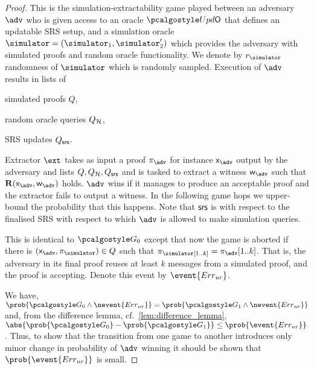 \begin{proof}		
	
	 This is the simulation-extractability game played between an adversary
	$\advse$ who is given access to an oracle $\initU$ that defines an updatable SRS
	setup, and a simulation oracle $\simulator = (\simulator_1, \simulator_2')$ which provides the adversary with simulated
	proofs and random oracle functionality. We denote by $\rsim$
	randomness of $\simulator$ which is randomly sampled. Execution of $\advse$ results in
	lists of
	\begin{inparaenum}[(1)]
		\item simulated proofs $Q$,
		\item random oracle queries $Q_{\mathcal{H}}$,
		\item SRS updates $Q_{\mathsf{srs}}$.
	\end{inparaenum}
	Extractor $\ext$ takes as input a proof $\zkproof_{\advse}$ for instance
	$\inp_{\advse}$ output by the adversary and lists $Q, Q_{\mathcal{H}}, Q_{\mathsf{srs}}$ and is tasked
	to extract a witness $\wit_{\advse}$ such that $\REL(\inp_{\advse}, \wit_{\advse})$
	holds. $\advse$ wins if it manages to produce an acceptable proof and the extractor
	fails to output a witness. In the following game hops we upper-bound the
	probability that this happens. Note that $\mathsf{srs}$ is with respect to the finalised
	SRS with respect to which $\adv$ is allowed to make simulation queries.
	
	 This is identical to $\game{0}$ except that now the game is aborted if
	there is $(\inp_\advse, \zkproof_{\simulator}) \in Q$ such that
	$\zkproof_\simulator[1..k] = \zkproof_{\advse}[1..k]$. That is, the adversary in
	its final proof reuses at least $k$ messages from a simulated proof, and the proof
	is accepting.  Denote this event by $\event{\errur}$.
	
	 We have,
	\( \prob{\game{0} \land \nevent{\errur}} = \prob{\game{1} \land \nevent{\errur}} \)
	and, from the difference lemma, cf.~\cref{lem:difference_lemma},
	$ \abs{\prob{\game{0}} - \prob{\game{1}}} \leq \prob{\event{\errur}}\,$.  Thus, to
	show that the transition from one game to another introduces only minor change in
	probability of $\adv$ winning it should be shown that $\prob{\event{\errur}}$ is
	small.
	

\end{proof}
